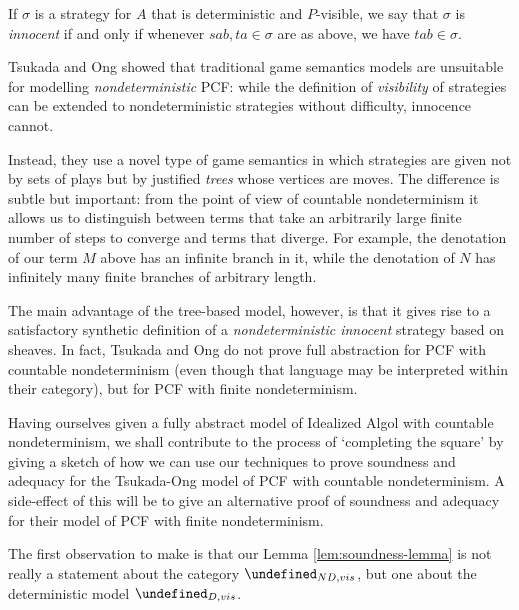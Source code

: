 \documentclass[sigplan,10pt,review]{acmart}\settopmatter{printfolios=true,printccs=false,printacmref=false}
\let\G\undefined
\begin{document}
If $\sigma$ is a strategy for $A$ that is deterministic and $P$-visible, we say that $\sigma$ is \emph{innocent} if and only if whenever $sab,ta\in\sigma$ are as above, we have $tab\in\sigma$.

Tsukada and Ong \cite{TsukadaSheaves} showed that traditional game semantics models are unsuitable for modelling \emph{nondeterministic} PCF: while the definition of \emph{visibility} of strategies can be extended to nondeterministic strategies without difficulty, innocence cannot.

Instead, they use a novel type of game semantics in which strategies are given not by sets of plays but by justified \emph{trees} whose vertices are moves.  
The difference is subtle but important: from the point of view of countable nondeterminism it allows us to distinguish between terms that take an arbitrarily large finite number of steps to converge and terms that diverge.  
For example, the denotation of our term $M$ above has an infinite branch in it, while the denotation of $N$ has infinitely many finite branches of arbitrary length.  

The main advantage of the tree-based model, however, is that it gives rise to a satisfactory synthetic definition of a \emph{nondeterministic innocent} strategy based on sheaves.  
In fact, Tsukada and Ong do not prove full abstraction for PCF with countable nondeterminism (even though that language may be interpreted within their category), but for PCF with finite nondeterminism.  

Having ourselves given a fully abstract model of Idealized Algol with countable nondeterminism, we shall contribute to the process of `completing the square' by giving a sketch of how we can use our techniques to prove soundness and adequacy for the Tsukada-Ong model of PCF with countable nondeterminism.  
A side-effect of this will be to give an alternative proof of soundness and adequacy for their model of PCF with finite nondeterminism.  

The first observation to make is that our Lemma \ref{lem:soundness-lemma} is not really a statement about the category $\G_{ND,vis}$, but one about the deterministic model $\G_{D,vis}$.  
\end{document}
